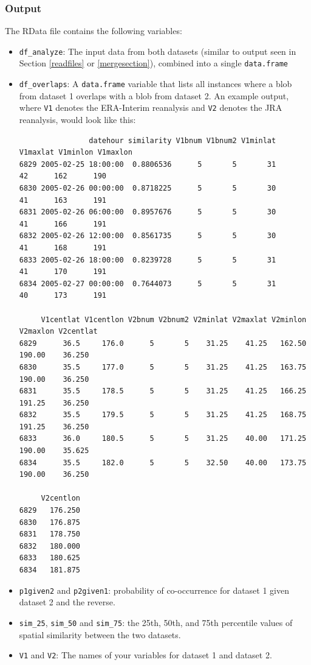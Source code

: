 \documentclass{article}
\begin{document}
\subsubsection{Output}

The RData file contains the following variables:
\begin{itemize}
\item \texttt{df\_analyze}: The input data from both datasets (similar to output seen in Section \ref{readfiles} or \ref{mergesection}), combined into a single \texttt{data.frame}
\item \texttt{df\_overlaps}: A \texttt{data.frame} variable that lists all instances where a blob from dataset 1 overlaps with a blob from dataset 2. An example output, where \texttt{V1} denotes the ERA-Interim reanalysis and \texttt{V2} denotes the JRA reanalysis, would look like this:
\begin{verbatim}
                datehour similarity V1bnum V1bnum2 V1minlat V1maxlat V1minlon V1maxlon
6829 2005-02-25 18:00:00  0.8806536      5       5       31       42      162      190
6830 2005-02-26 00:00:00  0.8718225      5       5       30       41      163      191
6831 2005-02-26 06:00:00  0.8957676      5       5       30       41      166      191
6832 2005-02-26 12:00:00  0.8561735      5       5       30       41      168      191
6833 2005-02-26 18:00:00  0.8239728      5       5       31       41      170      191
6834 2005-02-27 00:00:00  0.7644073      5       5       31       40      173      191

     V1centlat V1centlon V2bnum V2bnum2 V2minlat V2maxlat V2minlon V2maxlon V2centlat
6829      36.5     176.0      5       5    31.25    41.25   162.50   190.00    36.250
6830      35.5     177.0      5       5    31.25    41.25   163.75   190.00    36.250
6831      35.5     178.5      5       5    31.25    41.25   166.25   191.25    36.250
6832      35.5     179.5      5       5    31.25    41.25   168.75   191.25    36.250
6833      36.0     180.5      5       5    31.25    40.00   171.25   190.00    35.625
6834      35.5     182.0      5       5    32.50    40.00   173.75   190.00    36.250

     V2centlon
6829   176.250
6830   176.875
6831   178.750
6832   180.000
6833   180.625
6834   181.875
\end{verbatim}
\item \texttt{p1given2} and \texttt{p2given1}: probability of co-occurrence for dataset 1 given dataset 2 and the reverse.
\item \texttt{sim\_25}, \texttt{sim\_50} and \texttt{sim\_75}: the 25th, 50th, and 75th percentile values of spatial similarity between the two datasets.
\item \texttt{V1} and \texttt{V2}: The names of your variables for dataset 1 and dataset 2.
\end{itemize}
\end{document}
